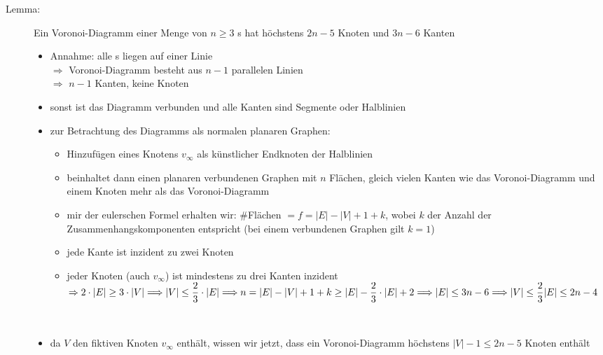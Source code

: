 \begin{description}
	\item[Lemma:] Ein Voronoi-Diagramm einer Menge von $n\geq 3$ \site s hat höchstens $2n-5$ Knoten und $3n-6$ Kanten
	\up\Proof
	\up\begin{itemize}
		\item Annahme: alle \site s liegen auf einer Linie\\
			$\Rightarrow$ Voronoi-Diagramm besteht aus $n-1$ parallelen Linien\\
			$\Rightarrow$ $n-1$ Kanten, keine Knoten
		\item sonst ist das Diagramm verbunden und alle Kanten sind Segmente oder Halblinien
		\item zur Betrachtung des Diagramms als normalen planaren Graphen:
			\begin{itemize}
				\item Hinzufügen eines Knotens $v_{\infty}$ als künstlicher Endknoten der Halblinien
				\item beinhaltet dann einen planaren verbundenen Graphen mit $n$ Flächen, gleich vielen Kanten wie das Voronoi-Diagramm und einem Knoten mehr als das Voronoi-Diagramm
				\item mir der eulerschen Formel erhalten wir: $\#$Flächen $=f = |E|-|V|+1+k$, wobei $k$ der Anzahl der Zusammenhangskomponenten entspricht (bei einem verbundenen Graphen gilt $k=1$)
				\item jede Kante ist inzident zu zwei Knoten
				\item jeder Knoten (auch $v_{\infty}$) ist mindestens zu drei Kanten inzident\\
				$\Rightarrow 2\cdot |E| \geq 3\cdot |V| \Longrightarrow |V| \leq \dfrac{2}{3}\cdot |E| \Longrightarrow n = |E|-|V|+1+k \geq |E|-\dfrac{2}{3}\cdot |E|+2\\
				\Longrightarrow |E|\leq 3n -6 \Longrightarrow |V|\leq \dfrac{2}{3}|E| \leq 2n -4$
			\end{itemize}
	\end{itemize}
\end{description}
\topbreak
\up\up\up
\begin{description}
	\item[]\ \\\up
		\begin{itemize}
			\item da $V$ den fiktiven Knoten $v_{\infty}$ enthält, wissen wir jetzt, dass ein Voronoi-Diagramm höchstens $|V|-1 \leq 2n-5$ Knoten enthält
		\end{itemize}
\end{description}
